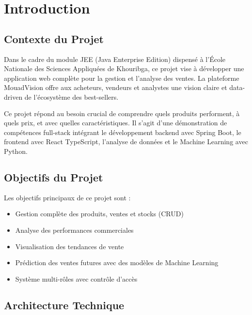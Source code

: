 \documentclass[12pt,a4paper]{report}
\begin{document}
\listoffigures
\newpage

\listoftables
\newpage

\chapter{Introduction}

\section{Contexte du Projet}

Dans le cadre du module JEE (Java Enterprise Edition) dispensé à l'École Nationale des Sciences Appliquées de Khouribga, ce projet vise à développer une application web complète pour la gestion et l'analyse des ventes. La plateforme MouadVision offre aux acheteurs, vendeurs et analystes une vision claire et data-driven de l'écosystème des best-sellers.

Ce projet répond au besoin crucial de comprendre quels produits performent, à quels prix, et avec quelles caractéristiques. Il s'agit d'une démonstration de compétences full-stack intégrant le développement backend avec Spring Boot, le frontend avec React TypeScript, l'analyse de données et le Machine Learning avec Python.

\section{Objectifs du Projet}

Les objectifs principaux de ce projet sont :

\begin{itemize}[noitemsep]
    \item Gestion complète des produits, ventes et stocks (CRUD)
    \item Analyse des performances commerciales
    \item Visualisation des tendances de vente
    \item Prédiction des ventes futures avec des modèles de Machine Learning
    \item Système multi-rôles avec contrôle d'accès
\end{itemize}

\section{Architecture Technique}
\end{document}
